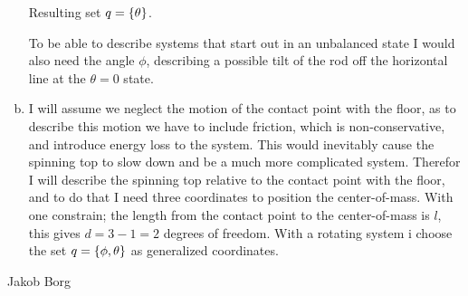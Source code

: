 \documentclass[11pt,a4paper]{report}
\newcounter{excount}[chapter]
\newenvironment{exercise}[1][]{\addtocounter{excount}{1} \noindent {\bf Problem
    \arabic{excount} \ \ #1}\hspace{2mm}}{\vspace{4mm}}
\newenvironment{solution}
    {\begin{tcolorbox}[title=Solution,halign lower=right,breakable]
    }
    {
    \tcblower Jakob Borg
    \end{tcolorbox}
	\vspace{5mm}
    }
\begin{document}
\begin{exercise}
\begin{solution}
\begin{enumerate}[a)]
Resulting set $q = \qty{\theta}$.
	
	
	To be able to describe systems that start out in an unbalanced state I would also need the angle $\phi$, describing a possible tilt of the rod off the horizontal line at the $\theta = 0$ state.
	\item I will assume we neglect the motion of the contact point with the floor, as to describe this motion we have to include friction, which is non-conservative, and introduce energy loss to the system. This would inevitably cause the spinning top to slow down and be a much more complicated system. Therefor I will describe the spinning top relative to the contact point with the floor, and to do that I need three coordinates to position the center-of-mass. With one constrain; the length from the contact point to the center-of-mass is $l$, this gives $d=3-1=2$ degrees of freedom. With a rotating system i choose the set $q = \qty{\phi,\theta}$ as generalized coordinates.
\end{enumerate}
\end{solution}
\end{exercise}
\end{document}
